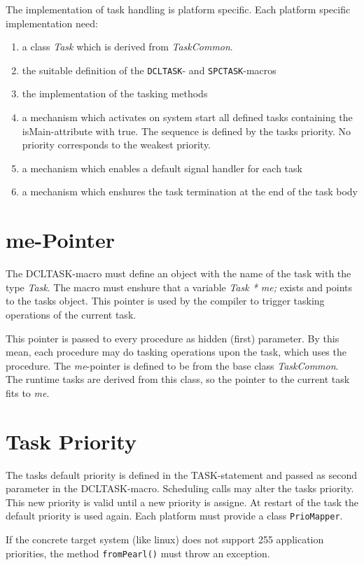 The implementation of task handling is platform specific.
Each platform specific implementation need:
\begin{enumerate}
\item  a class {\em Task} which is derived from {\em TaskCommon}.
\item the suitable definition of the \verb|DCLTASK|- and \verb|SPCTASK|-macros
\item the implementation of the tasking methods
\item a mechanism which activates on system start
   all defined tasks containing the isMain-attribute with true. 
   The sequence is defined by the tasks priority. 
   No priority corresponds to the weakest priority.
\item a mechanism which enables a default signal handler for each task
\item a mechanism which enshures the task termination at the end of
   the task body
\end{enumerate}

\section{me-Pointer}
The DCLTASK-macro must define an object with the name of the
task with the type {\em Task}.
The macro must enshure that a variable  {\em Task * me;} exists
and points to the tasks object. This pointer is used
by the compiler to trigger tasking operations of the current
task.

This pointer is passed to every procedure as hidden (first) parameter.
By this mean, each procedure may do tasking operations upon the
task, which uses the procedure.
The {\em me}-pointer is defined to be from the base class  {\em TaskCommon}. 
The runtime tasks are derived from this class, so the pointer to the current 
task fits to {\em me}.

\section{Task Priority}
The tasks default priority is defined in the TASK-statement and passed
as second parameter in the DCLTASK-macro.
Scheduling calls may alter the tasks priority. This new priority is valid 
until a new priority is assigne. At restart of the task the default 
priority is used again. Each platform must provide a class \verb|PrioMapper|.

If the concrete target system (like linux) does not support 255 
 application priorities, the method \verb|fromPearl()| must throw
an exception.



